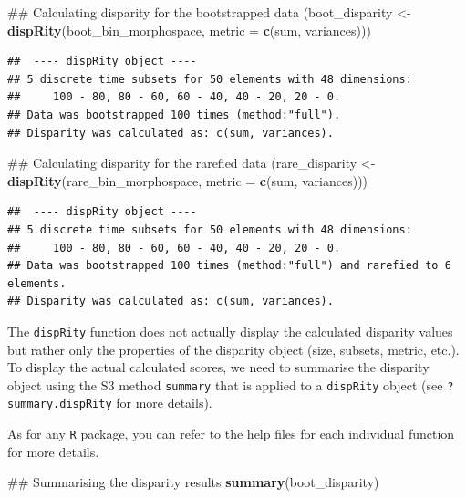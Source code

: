 \documentclass[]{book}
\newenvironment{Shaded}{\begin{snugshade}}{\end{snugshade}}
\newcommand{\KeywordTok}[1]{\textcolor[rgb]{0.13,0.29,0.53}{\textbf{#1}}}
\newcommand{\DataTypeTok}[1]{\textcolor[rgb]{0.13,0.29,0.53}{#1}}
\newcommand{\StringTok}[1]{\textcolor[rgb]{0.31,0.60,0.02}{#1}}
\newcommand{\NormalTok}[1]{#1}
\theoremstyle{definition}
\theoremstyle{definition}
\theoremstyle{remark}
\begin{document}
\begin{Shaded}
\begin{Highlighting}[]
\NormalTok{## Calculating disparity for the bootstrapped data}
\NormalTok{(boot_disparity <-}\StringTok{ }\KeywordTok{dispRity}\NormalTok{(boot_bin_morphospace, }\DataTypeTok{metric =} \KeywordTok{c}\NormalTok{(sum, variances)))}
\end{Highlighting}
\end{Shaded}

\begin{verbatim}
##  ---- dispRity object ---- 
## 5 discrete time subsets for 50 elements with 48 dimensions:
##     100 - 80, 80 - 60, 60 - 40, 40 - 20, 20 - 0.
## Data was bootstrapped 100 times (method:"full").
## Disparity was calculated as: c(sum, variances).
\end{verbatim}

\begin{Shaded}
\begin{Highlighting}[]
\NormalTok{## Calculating disparity for the rarefied data}
\NormalTok{(rare_disparity <-}\StringTok{ }\KeywordTok{dispRity}\NormalTok{(rare_bin_morphospace, }\DataTypeTok{metric =} \KeywordTok{c}\NormalTok{(sum, variances)))}
\end{Highlighting}
\end{Shaded}

\begin{verbatim}
##  ---- dispRity object ---- 
## 5 discrete time subsets for 50 elements with 48 dimensions:
##     100 - 80, 80 - 60, 60 - 40, 40 - 20, 20 - 0.
## Data was bootstrapped 100 times (method:"full") and rarefied to 6 elements.
## Disparity was calculated as: c(sum, variances).
\end{verbatim}

The \texttt{dispRity} function does not actually display the calculated
disparity values but rather only the properties of the disparity object
(size, subsets, metric, etc.). To display the actual calculated scores,
we need to summarise the disparity object using the S3 method
\texttt{summary} that is applied to a \texttt{dispRity} object (see
\texttt{?summary.dispRity} for more details).

As for any \texttt{R} package, you can refer to the help files for each
individual function for more details.

\begin{Shaded}
\begin{Highlighting}[]
\NormalTok{## Summarising the disparity results}
\KeywordTok{summary}\NormalTok{(boot_disparity)}
\end{Highlighting}
\end{Shaded}
\end{document}
